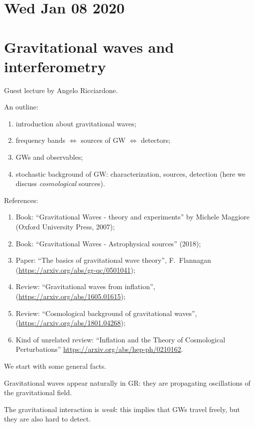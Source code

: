 \documentclass[main.tex]{subfiles}
\begin{document}
\section*{Wed Jan 08 2020}

\section{Gravitational waves and interferometry}

Guest lecture by Angelo Ricciardone.

An outline: 
\begin{enumerate}
  \item introduction about gravitational waves;
  \item frequency bands \(\iff\) sources of GW \(\iff\) detectors;
  \item GWs and observables;
  \item stochastic background of GW: characterization, sources, detection (here we discuss \emph{cosmological} sources).
\end{enumerate}

References: 

\begin{enumerate}
  \item Book: ``Gravitational Waves - theory and experiments'' by Michele Maggiore (Oxford University Press, 2007);
  \item Book: ``Gravitational Waves - Astrophysical sources'' (2018);
  \item Paper: ``The basics of gravitational wave theory'', F.\ Flannagan (\url{https://arxiv.org/abs/gr-qc/0501041});
  \item Review: ``Gravitational waves from inflation'', (\url{https://arxiv.org/abs/1605.01615});
  \item Review: ``Cosmological background of gravitational waves'', (\url{https://arxiv.org/abs/1801.04268});
  \item Kind of unrelated review: ``Inflation and the Theory of Cosmological Perturbations'' \url{https://arxiv.org/abs/hep-ph/0210162}.
\end{enumerate}

We start with some general facts.

Gravitational waves appear naturally in GR: they are 
propagating oscillations of the gravitational field.

The gravitational interaction is \emph{weak}: this implies that GWs travel freely, but they are also hard to detect.
\end{document}
